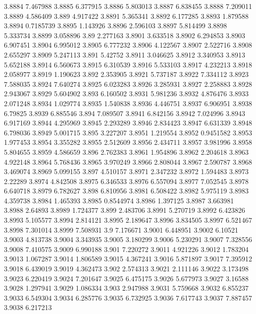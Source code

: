 3.8884  7.467988
3.8885  6.377915
3.8886  5.803013
3.8887  6.838455
3.8888  7.209011
3.8889  4.586409
3.889  4.917422
3.8891  5.365341
3.8892  6.177285
3.8893  1.879588
3.8894  0.7185739
3.8895  1.143926
3.8896  2.596103
3.8897  5.814499
3.8898  5.333734
3.8899  3.058896
3.89  2.277163
3.8901  3.633518
3.8902  6.294853
3.8903  6.907451
3.8904  6.995012
3.8905  6.777232
3.8906  4.122567
3.8907  2.522716
3.8908  2.655297
3.8909  5.247113
3.891  5.42752
3.8911  3.046625
3.8912  3.340953
3.8913  5.652188
3.8914  6.560673
3.8915  6.310539
3.8916  5.533103
3.8917  4.232213
3.8918  2.058977
3.8919  1.190623
3.892  2.353905
3.8921  5.737187
3.8922  7.334112
3.8923  7.588035
3.8924  7.640274
3.8925  6.023283
3.8926  3.285931
3.8927  2.258883
3.8928  2.943067
3.8929  5.604902
3.893  6.160502
3.8931  5.981236
3.8932  4.876476
3.8933  2.071248
3.8934  1.029774
3.8935  1.540838
3.8936  4.446751
3.8937  6.906951
3.8938  6.79825
3.8939  6.885546
3.894  7.089507
3.8941  6.842156
3.8942  7.024996
3.8943  6.917169
3.8944  4.295969
3.8945  2.293289
3.8946  2.834423
3.8947  6.631339
3.8948  6.798036
3.8949  5.001715
3.895  3.227207
3.8951  1.219554
3.8952  0.9451582
3.8953  1.977453
3.8954  3.355282
3.8955  2.512609
3.8956  2.434711
3.8957  3.981996
3.8958  5.804655
3.8959  4.586659
3.896  2.762383
3.8961  1.954896
3.8962  2.204618
3.8963  4.922148
3.8964  5.768436
3.8965  3.970249
3.8966  2.808044
3.8967  2.590787
3.8968  3.469074
3.8969  5.099155
3.897  4.510157
3.8971  2.347232
3.8972  1.594483
3.8973  2.22289
3.8974  4.842508
3.8975  6.346533
3.8976  6.557094
3.8977  7.052545
3.8978  6.640718
3.8979  6.782627
3.898  6.810956
3.8981  6.508422
3.8982  5.975119
3.8983  4.359738
3.8984  1.465393
3.8985  0.8544974
3.8986  1.397125
3.8987  3.663981
3.8988  2.64893
3.8989  1.724377
3.899  2.483706
3.8991  5.270719
3.8992  6.423826
3.8993  5.105577
3.8994  2.814121
3.8995  2.189647
3.8996  3.834505
3.8997  6.521467
3.8998  7.301014
3.8999  7.508931
3.9  7.176671
3.9001  6.448951
3.9002  6.10521
3.9003  4.813738
3.9004  3.343935
3.9005  3.180299
3.9006  5.230291
3.9007  7.328556
3.9008  7.410575
3.9009  6.990188
3.901  7.220272
3.9011  4.921226
3.9012  1.783204
3.9013  1.067287
3.9014  1.806589
3.9015  4.367241
3.9016  5.871897
3.9017  7.395912
3.9018  6.439019
3.9019  4.362473
3.902  2.574313
3.9021  2.111146
3.9022  3.173498
3.9023  6.220419
3.9024  7.201647
3.9025  6.475175
3.9026  5.677973
3.9027  3.16588
3.9028  1.297941
3.9029  1.086334
3.903  2.947988
3.9031  5.759668
3.9032  6.855237
3.9033  6.549304
3.9034  6.285776
3.9035  6.732925
3.9036  7.617743
3.9037  7.887457
3.9038  6.217213
